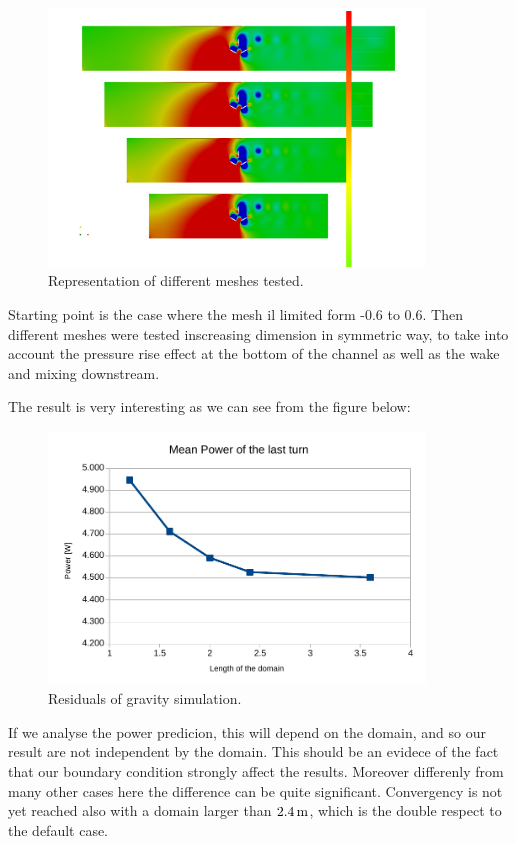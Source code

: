 \documentclass[a4paper,12pt]{article}
\begin{document}
\begin{figure}[H]
\centering
\includegraphics[width=10cm]{images/longmesh/confronto_mesh_long.png}
\caption{Representation of different meshes tested.}
\end{figure}

Starting point is the case where the mesh il limited form -0.6 to 0.6. 
Then different meshes were tested inscreasing dimension in symmetric way, to take into account the pressure rise effect at the bottom of the channel as well as the wake and mixing downstream. 

The result is very interesting as we can see from the figure below:
\begin{figure}[H]
\centering
\includegraphics[width=10cm]{images/longmesh/power.pdf}
\caption{Residuals of gravity simulation.}
\label{fig:domainlong-power}
\end{figure}
If we analyse the power predicion, this will depend on the domain, and so our result are not independent by the domain. This should be an evidece of the fact that our boundary condition strongly affect the results.
Moreover differenly from many other cases here the difference can be quite significant.
Convergency is not yet reached also with a domain larger than $2.4\,\text{m}$, which is the double respect to the default case.%
\end{document}
